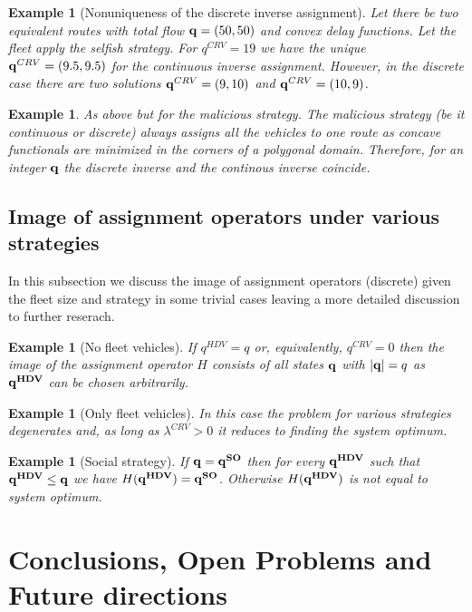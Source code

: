 \documentclass[a4paper,11pt]{article}
\newtheorem{example}[theorem]{Example}
\begin{document}
\begin{example}[Nonuniqueness of the discrete inverse assignment]
Let there be two equivalent routes with total flow $\bold{q} = (50,50)$ and convex delay functions. Let the fleet apply the selfish strategy. For $q^{CRV} = 19$ we have the unique $\bold{q}^{CRV} = (9.5,9.5)$ for the continuous inverse assignment. However, in the discrete case there are two solutions $\bold{q}^{CRV} = (9,10)$ and $\bold{q}^{CRV} = (10,9)$.
\end{example}
\begin{example}
As above but for the malicious strategy. The malicious strategy (be it continuous or discrete) always assigns all the vehicles to one route as concave functionals are minimized in the corners of a polygonal domain. Therefore, for an integer $\bold{q}$ the discrete inverse and the continous inverse coincide. 
\end{example}


\subsection{Image of assignment operators under various strategies}

In this subsection we discuss the image of assignment  operators (discrete) given the fleet size and strategy in some trivial cases leaving a more detailed discussion to further reserach.

\begin{example}[No fleet vehicles]
If $q^{HDV} = q$ or, equivalently, $q^{CRV} = 0$ then the image of the assignment operator $H$ consists of all states $\bold{q}$ with $|\bold{q}| = q$ as $\bold{q^{HDV}}$ can be chosen arbitrarily. 
\end{example}

\begin{example}[Only fleet vehicles]
In this case the problem for various strategies degenerates and, as long as $\lambda^{CRV}>0$ it reduces to finding the system optimum. 
\end{example}

\begin{example}[Social strategy]
If $\bold{q} = \bold{q^{SO}}$ then for every $\bold{q^{HDV}}$ such that $\bold{q^{HDV}} \le \bold{q}$ we have $H(\bold{q^{HDV}}) = \bold{q^{SO}}$. Otherwise $H(\bold{q^{HDV}})$ is not equal to system optimum. 
\end{example}



\section{Conclusions, Open Problems and Future directions}
\label{Sec_Discussion}
\end{document}

